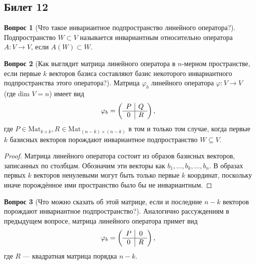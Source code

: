 \documentclass[a4paper,11pt]{article}
\theoremstyle{remark}
\theoremstyle{definition}
\newtheorem{question}{Вопрос}
\numberwithin{question}{subsection}
\begin{document}
\subsection{Билет 12}
\begin{question}[Что такое инвариантное подпространство линейного оператора?]
Подпространство \(W \subset V\) называется инвариантным относительно оператора \(A: V \rightarrow V\), если \(A(W) \subset W\).
\end{question}

\begin{question}[Как выглядит матрица линейного оператора в \(n\)-мерном пространстве, если первые \(k\) векторов базиса составляют базис некоторого инвариантного подпространства этого оператора?]
Матрица \(\varphi_b\) линейного оператора \(\varphi: V \rightarrow V\) (где dim \(V = n\)) имеет вид
\begin{equation*}
	\varphi_b =
	\left(\begin{array}{c | c}
		P & Q \\
		\hline
		0 & R
	\end{array}\right),
\end{equation*}
где \(P \in \mathrm{Mat}_{k \times k}, R \in \mathrm{Mat}_{(n-k) \times (n-k)}\) в том и только том случае, когда первые \(k\) базисных векторов порождают инвариантное подпространство \(W \subseteq V\).

\begin{proof}
Матрица линейного оператора состоит из образов базисных векторов, записанных по столбцам. Обозначим эти векторы как \(b_1, \dots, b_k, \dots, b_n\). В образах первых \(k\) векторов ненулевыми могут быть только первые \(k\) координат, поскольку иначе порождённое ими пространство было бы не инвариантным. 
\end{proof}
\end{question}

\begin{question}[Что можно сказать об этой матрице, если и последние \(n - k\) векторов порождают инвариантное подпространство?]
Аналогично рассуждениям в предыдущем вопросе, матрица линейного оператора примет вид 
\begin{equation*}
	\varphi_b =
	\left(\begin{array}{c | c}
		P & 0 \\
		\hline
		0 & R
	\end{array}\right),
\end{equation*}
где \(R\) --- квадратная матрица порядка \(n - k\).
\end{question}
\end{document}
